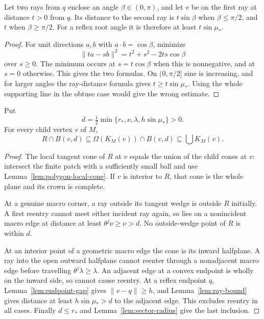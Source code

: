 \begin{lemma}
\label{lem:ray-bound}
Let two rays from $q$ enclose an angle $\beta\in(0,\pi)$, and let $v$ be
on the first ray at distance $t>0$ from $q$.  Its distance to the second
ray is $t\sin\beta$ when $\beta\le\pi/2$, and $t$ when
$\beta\ge\pi/2$.  For a reflex root angle it is therefore at least
$t\sin\mu_*$.
\end{lemma}
\begin{proof}
For unit directions $a,b$ with $a\mathbin{\cdot}b=\cos\beta$, minimize
\[
  \lVert ta-sb\rVert^2=t^2+s^2-2ts\cos\beta
\]
over $s\ge0$.  The minimum occurs at $s=t\cos\beta$ when this is
nonnegative, and at $s=0$ otherwise.  This gives the two formulas.  On
$(0,\pi/2]$ sine is increasing, and for larger angles the ray-distance
formula gives $t\ge t\sin\mu_*$.  Using the whole supporting line in
the obtuse case would give the wrong estimate.
\end{proof}

\begin{lemma}
\label{lem:relative-crown-ball}
Put
\[
 d=\tfrac12\min\{r_*,\nu,\lambda,h\sin\mu_*\}>0.
\]
For every child vertex $v$ of $M$,
\[
 R\cap B(v,d)\subseteq\Omega(K_M(v))\cap B(v,d)
                    \subseteq\bigcup K_M(v).
\]
\end{lemma}
\begin{proof}
The local tangent cone of $R$ at $v$ equals the union of the child cones
at $v$: intersect the finite patch with a sufficiently small ball and
use Lemma~\ref{lem:polygon-local-cone}.  If $v$ is interior to $R$, that
cone is the whole plane and its crown is complete.

At a genuine macro corner, a ray outside its tangent wedge is outside
$R$ initially.  A first reentry cannot meet either incident ray again,
so lies on a nonincident macro edge at distance at least
$\theta^j\nu\ge\nu>d$.  No outside-wedge point of $R$ is within $d$.

At an interior point of a geometric macro edge the cone is its inward
halfplane.  A ray into the open outward halfplane cannot reenter through
a nonadjacent macro edge before travelling $\theta^j\lambda\ge\lambda$.
An adjacent edge at a convex endpoint is wholly on the inward side, so
cannot cause reentry.  At a reflex endpoint $q$,
Lemma~\ref{lem:endpoint-gap} gives $\lVert v-q\rVert\ge h$, and
Lemma~\ref{lem:ray-bound} gives distance at least $h\sin\mu_*>d$ to
the adjacent edge.  This excludes reentry in all cases.  Finally
$d\le r_*$ and Lemma~\ref{lem:sector-radius} give the last inclusion.
\end{proof}

